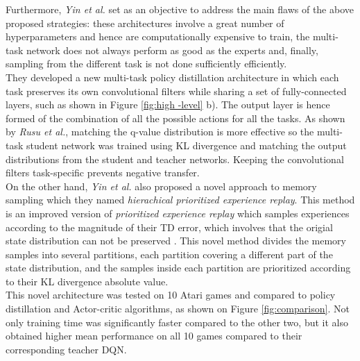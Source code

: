 \documentclass{article}
\begin{document}
Furthermore, \textit{Yin et al.} \citep{YinKnowledgeReplay} set as an objective to address the main flaws of the above proposed strategies: these architectures involve a great number of hyperparameters and hence are computationally expensive to train, the multi-task network does not always perform as good as the experts and, finally, sampling from the different task is not done sufficiently efficiently.\\
They developed a new multi-task policy distillation architecture in which each task preserves its own convolutional filters while sharing a set of fully-connected layers, such as shown in Figure \ref{fig:high -level} b). The output layer is hence formed of the combination of all the possible actions for all the tasks. As shown by \textit{Rusu et al.}, matching the q-value distribution is more effective so the multi-task student network was trained using KL divergence and matching the output distributions from the student and teacher networks. Keeping the convolutional filters task-specific prevents negative transfer.\\
On the other hand, \textit{Yin et al.} also proposed a novel approach to memory sampling which they named \textit{hierachical prioritized experience replay}. This method is an improved version of \textit{prioritized experience replay} \citep{Schaul2015PrioritizedReplay} which samples experiences according to the magnitude of their TD error, which involves that the origial state distribution can not be preserved \cite{YinKnowledgeReplay}. This novel method divides the memory samples into several partitions, each partition covering a different part of the state distribution, and the samples inside each partition are prioritized according to their KL divergence absolute value.\\
This novel architecture was tested on 10 Atari games and compared to policy distillation and Actor-critic algorithms, as shown on Figure \ref{fig:comparison}. Not only training time was significantly faster compared to the other two, but it also obtained higher mean performance on all 10 games compared to their corresponding teacher DQN.\\
\end{document}
